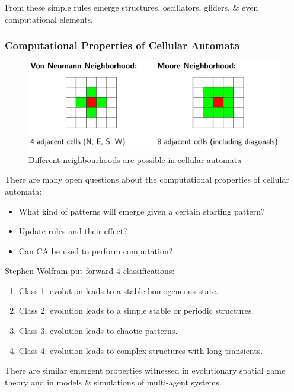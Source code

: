 \documentclass[a4paper,11pt]{article}
\begin{document}
From these simple rules emerge structures, oscillators, gliders, \& even computational elements.

\subsubsection{Computational Properties of Cellular Automata}
\begin{figure}[H]
    \centering
    \includegraphics[width=\textwidth]{./images/cellularneighbourhoods.png}
    \caption{ Different neighbourhoods are possible in cellular automata }
\end{figure}

There are many open questions about the computational properties of cellular automata:
\begin{itemize}
    \item   What kind of patterns will emerge given a certain starting pattern?
    \item   Update rules and their effect?
    \item   Can CA be used to perform computation?
\end{itemize}

Stephen Wolfram put forward 4 classifications:
\begin{enumerate}
    \item   Class 1: evolution leads to a stable homogeneous state.
    \item   Class 2: evolution leads to a simple stable or periodic structures.
    \item   Class 3: evolution leads to chaotic patterns.
    \item   Class 4: evolution leads to complex structures with long transients.
\end{enumerate}

There are similar emergent properties witnessed in evolutionary spatial game theory and in models \& simulations of multi-agent systems. 
\end{document}
